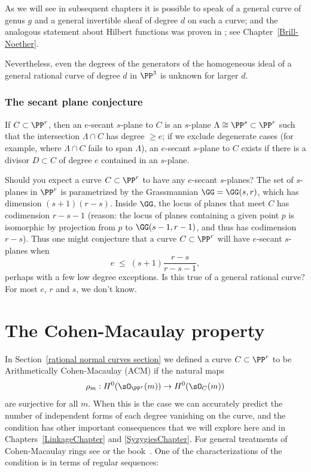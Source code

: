 As we will see in subsequent chapters it is possible to speak of a general curve of genus $g$
and a general invertible sheaf of degree $d$ on such a curve; and the analogous statement 
about Hilbert functions  was proven in \cite{ELarson2018}; see Chapter~\ref{Brill-Noether}.

Nevertheless, even the degrees of the generators of the homogeneous ideal of a general
rational curve of degree $d$ in $\PP^3$ is unknown for larger $d$. 

\subsubsection{The secant plane conjecture}

If $C \subset \PP^r$, then an $e$-secant $s$-plane to $C$ is an $s$-plane $\Lambda \cong \PP^s \subset \PP^r$ such that the intersection $\Lambda \cap C$ has degree $\geq e$; if we exclude degenerate cases (for example, where $\Lambda \cap C$ fails to span $\Lambda$), an $e$-secant $s$-plane to $C$ exists if there is a divisor $D \subset C$ of degree $e$  contained in an $s$-plane.

Should you expect a curve $C \subset \PP^r$ to have any $e$-secant $s$-planes? The set of $s$-planes in $\PP^r$ is parametrized by the Grassmannian $\GG = \GG(s,r)$, which has dimension $(s+1)(r-s)$. Inside $\GG$, the locus of planes that meet $C$ has codimension $r-s-1$ (reason: the locus of planes containing a given point $p$ is isomorphic
by projection from $p$ to $\GG(s-1,r-1)$, and thus has codimension $r-s$). Thus one might conjecture that a curve $C \subset \PP^r$ will have $e$-secant $s$-planes when 
$$
e \; \leq \; (s+1)\frac{r-s}{r-s-1},
$$
perhaps with a few low degree exceptions. Is this true of a general rational curve? For most $e$, $r$ and $s$, we don't know.

\section{The Cohen-Macaulay property}\label{ACM}

In Section~\ref{rational normal curves section} we defined a curve $C\subset \PP^{r}$ to be Arithmetically Cohen-Macaulay (ACM) if the natural maps
$$
\rho_m: H^0(\sO_{\PP^r}(m)) \to H^0(\sO_{C}(m))
$$
are surjective for all $m$. When this is the case we can accurately predict the number of independent forms of
each degree vanishing on the curve, and the condition has other important consequences that we will explore here and in Chapters~\ref{LinkageChapter} and \ref{SyzygiesChapter}. For general treatments of 
Cohen-Macaulay rings see \cite[Chapter 18]{Eisenbud1995} or the book~\cite{BrunsHerzog}. One of the characterizations of the condition is in terms of regular sequences:

